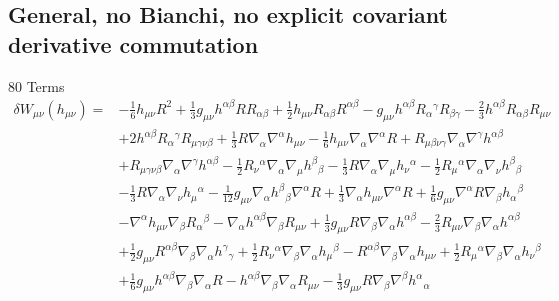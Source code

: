 \documentclass[10pt,letterpaper]{article}
\begin{document}
\subsection*{General, no Bianchi, no explicit covariant derivative commutation}
80 Terms
 \begin{align}
\delta W_{\mu\nu}(h_{\mu\nu})={}&- \tfrac{1}{6} h_{\mu \nu} R^2
 + \tfrac{1}{3} g_{\mu \nu} h^{\alpha \beta} R R_{\alpha \beta}
 + \tfrac{1}{2} h_{\mu \nu} R_{\alpha \beta} R^{\alpha \beta}
 -  g_{\mu \nu} h^{\alpha \beta} R_{\alpha}{}^{\gamma} R_{\beta \gamma}
 -  \tfrac{2}{3} h^{\alpha \beta} R_{\alpha \beta} R_{\mu \nu}\nonumber\\
& + 2 h^{\alpha \beta} R_{\alpha}{}^{\gamma} R_{\mu \gamma \nu \beta}
 + \tfrac{1}{3} R \nabla_{\alpha}\nabla^{\alpha}h_{\mu \nu}
 -  \tfrac{1}{6} h_{\mu \nu} \nabla_{\alpha}\nabla^{\alpha}R
 + R_{\mu \beta \nu \gamma} \nabla_{\alpha}\nabla^{\gamma}h^{\alpha \beta}\nonumber\\
& + R_{\mu \gamma \nu \beta} \nabla_{\alpha}\nabla^{\gamma}h^{\alpha \beta}
 -  \tfrac{1}{2} R_{\nu}{}^{\alpha} \nabla_{\alpha}\nabla_{\mu}h^{\beta}{}_{\beta}
 -  \tfrac{1}{3} R \nabla_{\alpha}\nabla_{\mu}h_{\nu}{}^{\alpha}
 -  \tfrac{1}{2} R_{\mu}{}^{\alpha} \nabla_{\alpha}\nabla_{\nu}h^{\beta}{}_{\beta}\nonumber\\
& -  \tfrac{1}{3} R \nabla_{\alpha}\nabla_{\nu}h_{\mu}{}^{\alpha}
 -  \tfrac{1}{12} g_{\mu \nu} \nabla_{\alpha}h^{\beta}{}_{\beta} \nabla^{\alpha}R
 + \tfrac{1}{3} \nabla_{\alpha}h_{\mu \nu} \nabla^{\alpha}R
 + \tfrac{1}{6} g_{\mu \nu} \nabla^{\alpha}R \nabla_{\beta}h_{\alpha}{}^{\beta}\nonumber\\
& -  \nabla^{\alpha}h_{\mu \nu} \nabla_{\beta}R_{\alpha}{}^{\beta}
 -  \nabla_{\alpha}h^{\alpha \beta} \nabla_{\beta}R_{\mu \nu}
 + \tfrac{1}{3} g_{\mu \nu} R \nabla_{\beta}\nabla_{\alpha}h^{\alpha \beta}
 -  \tfrac{2}{3} R_{\mu \nu} \nabla_{\beta}\nabla_{\alpha}h^{\alpha \beta}\nonumber\\
& + \tfrac{1}{2} g_{\mu \nu} R^{\alpha \beta} \nabla_{\beta}\nabla_{\alpha}h^{\gamma}{}_{\gamma}
 + \tfrac{1}{2} R_{\nu}{}^{\alpha} \nabla_{\beta}\nabla_{\alpha}h_{\mu}{}^{\beta}
 -  R^{\alpha \beta} \nabla_{\beta}\nabla_{\alpha}h_{\mu \nu}
 + \tfrac{1}{2} R_{\mu}{}^{\alpha} \nabla_{\beta}\nabla_{\alpha}h_{\nu}{}^{\beta}\nonumber\\
& + \tfrac{1}{6} g_{\mu \nu} h^{\alpha \beta} \nabla_{\beta}\nabla_{\alpha}R
 -  h^{\alpha \beta} \nabla_{\beta}\nabla_{\alpha}R_{\mu \nu}
 -  \tfrac{1}{3} g_{\mu \nu} R \nabla_{\beta}\nabla^{\beta}h^{\alpha}{}_{\alpha}

\end{align}
\end{document}
